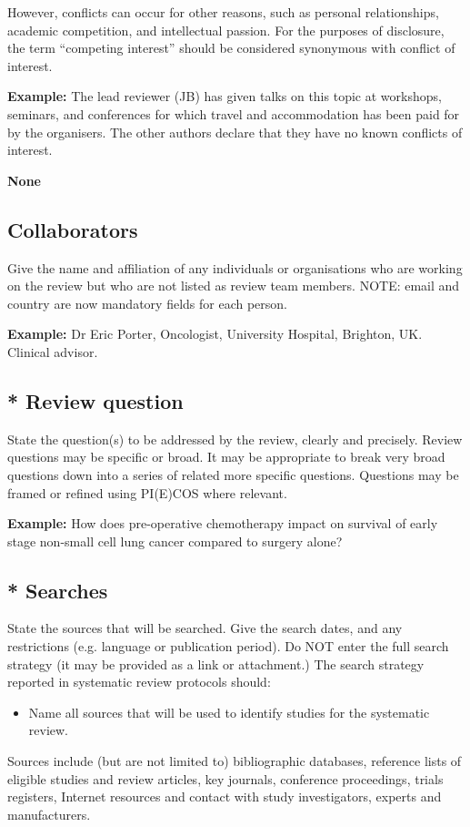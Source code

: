 \documentclass{qqtarticle}
\begin{document}
    However, conflicts can occur for other reasons, such as personal relationships, academic competition, and intellectual
    passion. For the purposes of disclosure, the term “competing interest” should be considered synonymous with conflict of
    interest.

    \textbf{Example:} The lead reviewer (JB) has given talks on this topic at workshops, seminars, and conferences for which travel
    and accommodation has been paid for by the organisers. The other authors declare that they have no known conflicts of
    interest.

    \textbf{None}

    \subsection{Collaborators}
    Give the name and affiliation of any individuals or organisations who are working on the review but who are not listed as
    review team members. NOTE: email and country are now mandatory fields for each person.

    \textbf{Example:} Dr Eric Porter, Oncologist, University Hospital, Brighton, UK. Clinical advisor.


    \subsection{* Review question}
    State the question(s) to be addressed by the review, clearly and precisely. Review questions may be specific or broad. It
    may be appropriate to break very broad questions down into a series of related more specific questions. Questions may be
    framed or refined using PI(E)COS where relevant.

    \textbf{Example:} How does pre-operative chemotherapy impact on survival of early stage non-small cell lung cancer compared
    to surgery alone?

    \subsection{* Searches}
    State the sources that will be searched. Give the search dates, and any restrictions (e.g. language or publication period).
    Do NOT enter the full search strategy (it may be provided as a link or attachment.)
    The search strategy reported in systematic review protocols should:
    \begin{itemize}
        \item Name all sources that will be used to identify studies for the systematic review.
    \end{itemize}
    Sources include (but are not limited to) bibliographic databases, reference lists of eligible studies and review articles, key
    journals, conference proceedings, trials registers, Internet resources and contact with study investigators, experts and
    manufacturers.
\end{document}
